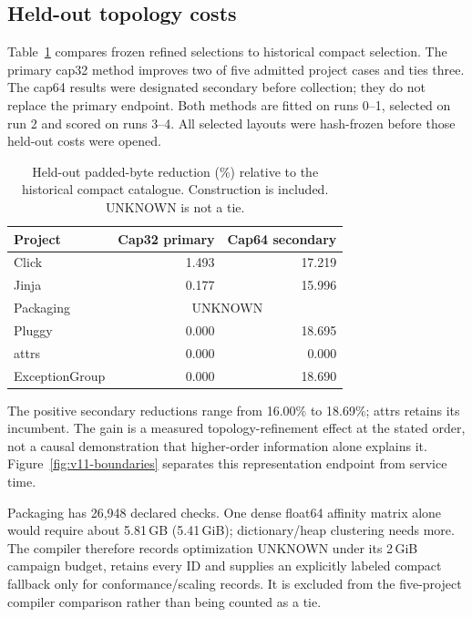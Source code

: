 \subsection{Held-out topology costs}
Table~\ref{tab:v11-gains} compares frozen refined selections to historical
compact selection. The primary cap32 method improves two of five admitted
project cases and ties three. The cap64 results were designated secondary
before collection; they do not replace the primary endpoint. Both methods
are fitted on runs 0--1, selected on run 2 and scored on runs 3--4.
All selected layouts were hash-frozen before those held-out costs were opened.
\begin{table}[t]\centering\footnotesize
\caption{Held-out padded-byte reduction (\%) relative to the historical
compact catalogue. Construction is included. UNKNOWN is not a tie.}
\label{tab:v11-gains}
\begin{tabular}{@{}lrr@{}}\toprule
Project & Cap32 primary & Cap64 secondary\\\midrule
Click & 1.493 & 17.219 \\
Jinja & 0.177 & 15.996 \\
Packaging & \multicolumn{2}{c}{UNKNOWN} \\
Pluggy & 0.000 & 18.695 \\
attrs & 0.000 & 0.000 \\
ExceptionGroup & 0.000 & 18.690 \\
\bottomrule\end{tabular}
\end{table}

The positive secondary reductions range from 16.00\% to 18.69\%; attrs
retains its incumbent. The gain is a measured topology-refinement effect
at the stated order, not a causal demonstration that higher-order information
alone explains it. Figure~\ref{fig:v11-boundaries} separates this representation
endpoint from service time.

Packaging has 26,948 declared checks. One dense float64 affinity matrix
alone would require about 5.81\,GB (5.41\,GiB); dictionary/heap clustering
needs more. The compiler therefore records optimization UNKNOWN under its
2\,GiB campaign budget, retains every ID and supplies an explicitly labeled
compact fallback only for conformance/scaling records. It is excluded from
the five-project compiler comparison rather than being counted as a tie.


